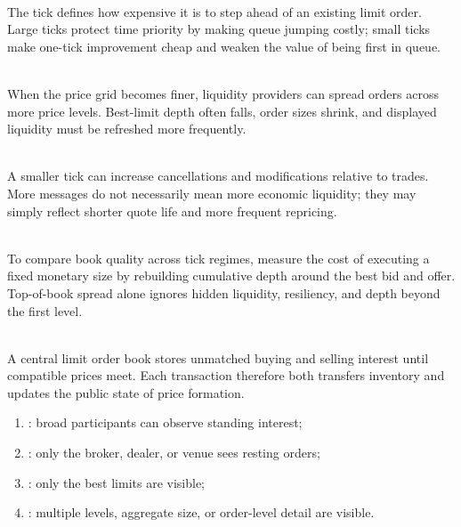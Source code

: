 \begin{principle} \\
The tick defines how expensive it is to step ahead of an existing limit order.\\
Large ticks protect time priority by making queue jumping costly; small ticks make one-tick improvement cheap and weaken the value of being first in queue.
\end{principle}

\begin{mechanism} \\
When the price grid becomes finer, liquidity providers can spread orders across more price levels. Best-limit depth often falls, order sizes shrink, and displayed liquidity must be refreshed more frequently.
\end{mechanism}

\begin{caveat} \\
A smaller tick can increase cancellations and modifications relative to trades. More messages do not necessarily mean more economic liquidity; they may simply reflect shorter quote life and more frequent repricing.
\end{caveat}

\begin{mechanism} \\
To compare book quality across tick regimes, measure the cost of executing a fixed monetary size by rebuilding cumulative depth around the best bid and offer. Top-of-book spread alone ignores hidden liquidity, resiliency, and depth beyond the first level.
\end{mechanism}

\begin{principle} \\
A central limit order book stores unmatched buying and selling interest until compatible prices meet. Each transaction therefore both transfers inventory and updates the public state of price formation.
\end{principle}

\begin{taxonomy} 
\begin{enumerate}[label=\roman*.]
\setlength{\itemsep}{0pt}
\item {}: broad participants can observe standing interest;
\item {}: only the broker, dealer, or venue sees resting orders;
\item {}: only the best limits are visible;
\item {}: multiple levels, aggregate size, or order-level detail are visible.
\end{enumerate}
\end{taxonomy}

